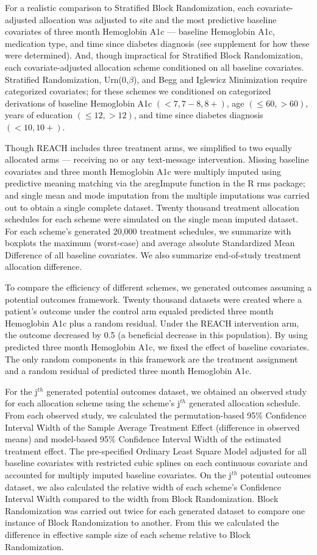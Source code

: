 \documentclass[12pt,oneside]{book}
\newlength{\li}\setlength{\li}{14.48pt}
\newlength{\di}\setlength{\di}{-3.5mm}
\theoremstyle{definition}
\theoremstyle{definition}
\theoremstyle{definition}
\theoremstyle{remark}
\begin{document}
For a realistic comparison to Stratified Block Randomization, each
covariate-adjusted allocation was adjusted to site and the most
predictive baseline covariates of three month Hemoglobin A1c ---
baseline Hemoglobin A1c, medication type, and time since diabetes
diagnosis (see supplement for how these were determined). And, though
impractical for Stratified Block Randomization, each covariate-adjusted
allocation scheme conditioned on all baseline covariates. Stratified
Randomization, Urn(0,\(\beta\)), and Begg and Iglewicz Minimization
require categorized covariates; for these schemes we conditioned on
categorized derivations of baseline Hemoglobin A1c \((<7, 7-8, 8+)\),
age \((\leq 60, >60)\), years of education \((\leq 12, >12)\), and time
since diabetes diagnosis \((<10, 10+)\).

Though REACH includes three treatment arms, we simplified to two equally
allocated arms --- receiving no or any text-message intervention.
Missing baseline covariates and three month Hemoglobin A1c were multiply
imputed using predictive meaning matching via the aregImpute function in
the R rms package; and single mean and mode imputation from the multiple
imputations was carried out to obtain a single complete dataset. Twenty
thousand treatment allocation schedules for each scheme were simulated
on the single mean imputed dataset. For each scheme's generated 20,000
treatment schedules, we summarize with boxplots the maximum (worst-case)
and average absolute Standardized Mean Difference of all baseline
covariates. We also summarize end-of-study treatment allocation
difference.

To compare the efficiency of different schemes, we generated outcomes
assuming a potential outcomes framework. Twenty thousand datasets were
created where a patient's outcome under the control arm equaled
predicted three month Hemoglobin A1c plus a random residual. Under the
REACH intervention arm, the outcome decreased by 0.5 (a beneficial
decrease in this population). By using predicted three month Hemoglobin
A1c, we fixed the effect of baseline covariates. The only random
components in this framework are the treatment assignment and a random
residual of predicted three month Hemoglobin A1c.

For the j\(^{th}\) generated potential outcomes dataset, we obtained an
observed study for each allocation scheme using the scheme's j\(^{th}\)
generated allocation schedule. From each observed study, we calculated
the permutation-based 95\% Confidence Interval Width of the Sample
Average Treatment Effect (difference in observed means) and model-based
95\% Confidence Interval Width of the estimated treatment effect. The
pre-specified Ordinary Least Square Model adjusted for all baseline
covariates with restricted cubic splines on each continuous covariate
and accounted for multiply imputed baseline covariates. On the
j\(^{th}\) potential outcomes dataset, we also calculated the relative
width of each scheme's Confidence Interval Width compared to the width
from Block Randomization. Block Randomization was carried out twice for
each generated dataset to compare one instance of Block Randomization to
another. From this we calculated the difference in effective sample size
of each scheme relative to Block Randomization.
\end{document}
